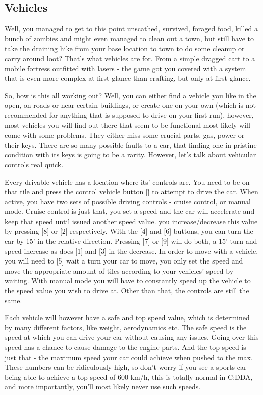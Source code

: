 \subsection{Vehicles}

Well, you managed to get to this point unscathed, survived, foraged food, killed a bunch of zombies and might even managed to clean out a town, but still have to take the draining hike from your base location to town to do some cleanup or carry around loot? That's what vehicles are for. From a simple dragged cart to a mobile fortress outfitted with lasers - the game got you covered with a system that is even more complex at first glance than crafting, but only at first glance.

So, how is this all working out? Well, you can either find a vehicle you like in the open, on roads or near certain buildings, or create one on your own (which is not recommended for anything that is supposed to drive on your first run), however, most vehicles you will find out there that seem to be functional most likely will come with some problems. They either miss some crucial parts, gas, power or their keys. There are so many possible faults to a car, that finding one in pristine condition with its keys is going to be a rarity. However, let's talk about vehicular controls real quick.

Every drivable vehicle has a location where its' controls are. You need to be on that tile and press the control vehicle button [\^] to attempt to drive the car. When active, you have two sets of possible driving controls - cruise control, or manual mode. Cruise control is just that, you set a speed and the car will accelerate and keep that speed until issued another speed value. you increase/decrease this value by pressing [8] or [2] respectively. With the [4] and [6] buttons, you can turn the car by 15' in the relative direction. Pressing [7] or [9] will do both, a 15' turn and speed increase as does [1] and [3] in the decrease. In order to move with a vehicle, you will need to [5] wait a turn your car to move, you only set the speed and move the appropriate amount of tiles according to your vehicles' speed by waiting. With manual mode you will have to constantly speed up the vehicle to the speed value you wish to drive at. Other than that, the controls are still the same.

Each vehicle will however have a safe and top speed value, which is determined by many different factors, like weight, aerodynamics etc. The safe speed is the speed at which you can drive your car without causing any issues. Going over this speed has a chance to cause damage to the engine parts. And the top speed is just that - the maximum speed your car could achieve when pushed to the max. These numbers can be ridiculously high, so don't worry if you see a sports car being able to achieve a top speed of 600 km/h, this is totally normal in C:DDA, and more importantly, you'll most likely never use such speeds.

